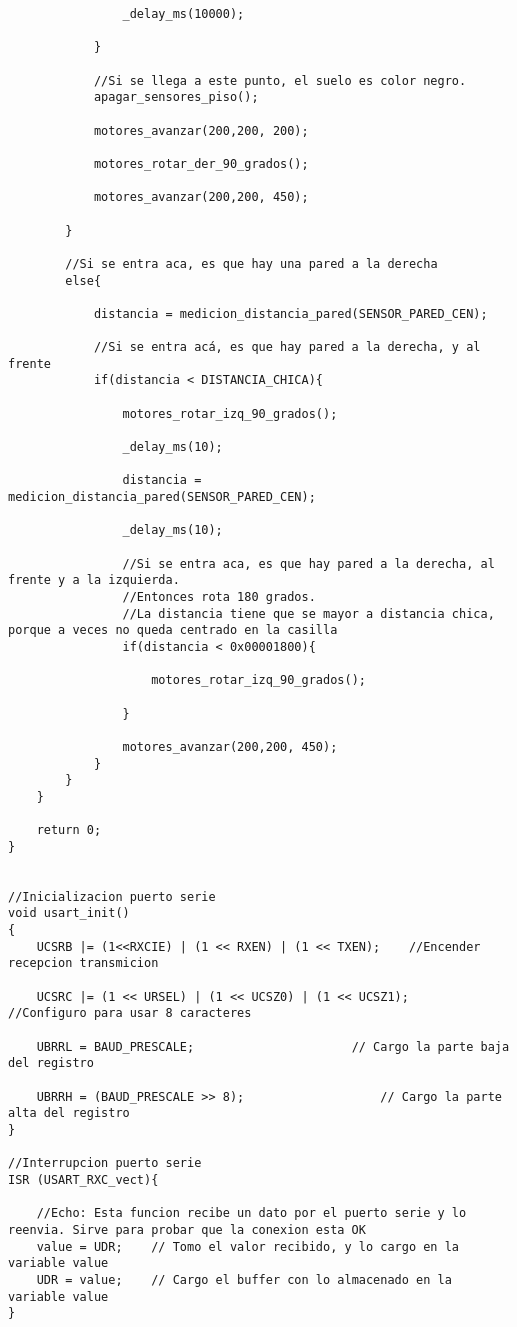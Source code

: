 \documentclass[a4paper,12pt]{article}   %
\begin{document}
\begin{lstlisting}
                _delay_ms(10000);

            }

            //Si se llega a este punto, el suelo es color negro.
            apagar_sensores_piso();

            motores_avanzar(200,200, 200);

            motores_rotar_der_90_grados();

            motores_avanzar(200,200, 450);

        }

        //Si se entra aca, es que hay una pared a la derecha
        else{

            distancia = medicion_distancia_pared(SENSOR_PARED_CEN);

            //Si se entra acá, es que hay pared a la derecha, y al frente
            if(distancia < DISTANCIA_CHICA){

                motores_rotar_izq_90_grados();

                _delay_ms(10);

                distancia = medicion_distancia_pared(SENSOR_PARED_CEN);

                _delay_ms(10);

                //Si se entra aca, es que hay pared a la derecha, al frente y a la izquierda.
                //Entonces rota 180 grados.
                //La distancia tiene que se mayor a distancia chica, porque a veces no queda centrado en la casilla
                if(distancia < 0x00001800){

                    motores_rotar_izq_90_grados();

                }

                motores_avanzar(200,200, 450);
            }
        }
    }

	return 0;
}


//Inicializacion puerto serie
void usart_init()
{
	UCSRB |= (1<<RXCIE) | (1 << RXEN) | (1 << TXEN);	//Encender recepcion transmicion

	UCSRC |= (1 << URSEL) | (1 << UCSZ0) | (1 << UCSZ1); 	//Configuro para usar 8 caracteres

	UBRRL = BAUD_PRESCALE; 				        // Cargo la parte baja del registro

	UBRRH = (BAUD_PRESCALE >> 8); 			        // Cargo la parte alta del registro
}

//Interrupcion puerto serie
ISR (USART_RXC_vect){

    //Echo: Esta funcion recibe un dato por el puerto serie y lo reenvia. Sirve para probar que la conexion esta OK
	value = UDR;    // Tomo el valor recibido, y lo cargo en la variable value
	UDR = value;	// Cargo el buffer con lo almacenado en la variable value
}



\end{lstlisting}
\end{document}
